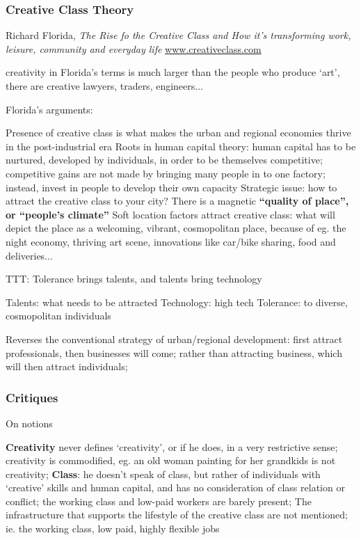 \documentclass{article}
\begin{document}
\subsubsection{Creative Class Theory}

Richard Florida, \textit{The Rise fo the Creative Class and How it's transforming work, leisure, community and everyday life} \url{www.creativeclass.com}

creativity in Florida's terms is much larger than the people who produce `art', there are creative lawyers, traders, engineers...

Florida's arguments:

\begin{outline}
	\1 Presence of creative class is what makes the urban and regional economies thrive in the post-industrial era
		\2 Roots in human capital theory: human capital has to be nurtured, developed by individuals, in order to be themselves competitive; competitive gains are not made by bringing many people in to one factory; instead, invest in people to develop their own capacity
	\1 Strategic issue: how to attract the creative class to your city? There is a magnetic \textbf{``quality of place'', or ``people's climate''}
		\2 Soft location factors attract creative class: what will depict the place as a welcoming, vibrant, cosmopolitan place, because of eg. the night economy, thriving art scene, innovations like car/bike sharing, food and deliveries...
\end{outline}
		
TTT: Tolerance brings talents, and talents bring technology

Talents: what needs to be attracted
Technology: high tech
Tolerance: to diverse, cosmopolitan individuals

Reverses the conventional strategy of urban/regional development: first attract professionals, then businesses will come; rather than attracting business, which will then attract individuals;

\subsubsection{Critiques}

On notions

\begin{outline}
	\1 \textbf{Creativity} never defines `creativity', or if he does, in a very restrictive sense; creativity is commodified, eg. an old woman painting for her grandkids is not creativity;
	\1 \textbf{Class}: he doesn't speak of class, but rather of individuals with `creative' skills and human capital, and has no consideration of class relation or conflict; the working class and low-paid workers are barely present;
		\2 The infrastructure that supports the lifestyle of the creative class are not mentioned; ie. the working class, low paid, highly flexible jobs
\end{outline}
\end{document}
